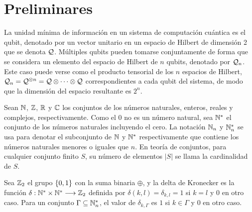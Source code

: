 \section{Preliminares}
La unidad mínima de información en un sistema de computación cuántica es el qubit, denotado por un vector unitario en un espacio de Hilbert de dimensión 2 que se denota $\mathcal{Q}$.
Múltiples qubits pueden tomarse conjuntamente de forma que se considera un elemento del espacio de Hilbert de $n$ qubits, denotado por $\mathcal{Q}_n$.
Este caso puede verse como el producto tensorial de los $n$ espacios de Hilbert, $\mathcal{Q}_n=\mathcal{Q}^{\otimes n}=\mathcal{Q}\otimes\dots\otimes\mathcal{Q}$ correspondientes a cada qubit del sistema, de modo que la dimensión del espacio resultante es $2^n$.

Sean $\mathbb{N}$, $\mathbb{Z}$, $\mathbb{R}$ y $\mathbb{C}$ los conjuntos de los números naturales, enteros, reales y complejos, respectivamente.
Como el $0$ no es un número natural, sea $\mathbb{N}^*$ el conjunto de los números naturales incluyendo el cero.
La notación $\mathbb{N}_n$ y $\mathbb{N}^*_n$ se usa para denotar el subconjunto de $\mathbb{N}$ y $\mathbb{N}^*$ respectivamente que contiene los números naturales menores o iguales que $n$.
En teoría de conjuntos, para cualquier conjunto finito $S$, su número de elementos $|S|$ se llama la cardinalidad de $S$.

Sea $\mathbb{Z}_2$ el grupo $\{0,1\}$ con la suma binaria $\oplus$, y la delta de Kronecker es la función $\delta:\mathbb{N}^*\times\mathbb{N}^*\longrightarrow\mathbb{Z}_2$ definida por $\delta(k,l)=\delta_{k,l}=1$ si $k=l$ y $0$ en otro caso.
Para un conjunto $\Gamma\subseteq\mathbb{N}^*_n$, el valor de $\delta_{k,\Gamma}$ es $1$ si $k\in\Gamma$ y $0$ en otro caso.
